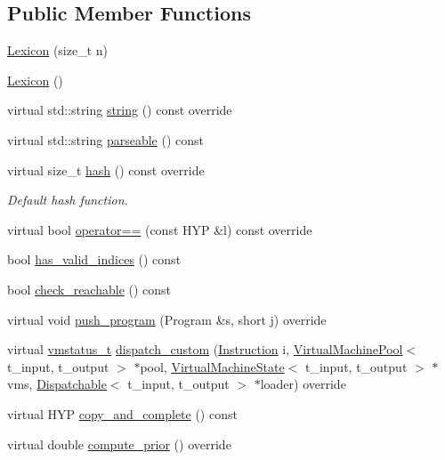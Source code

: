 \subsection*{Public Member Functions}
\begin{DoxyCompactItemize}
\item 
\hyperlink{class_lexicon_a8dde249de3f884484ff14de62a2c6df2}{Lexicon} (size\+\_\+t n)
\item 
\hyperlink{class_lexicon_a1b81e27f60f3e1cb7c0b376ac66aff45}{Lexicon} ()
\item 
virtual std\+::string \hyperlink{class_lexicon_aad37474da522d811415c1ba45ca72dff}{string} () const override
\item 
virtual std\+::string \hyperlink{class_lexicon_a8eda74c4e7500b31a382c182ac60436a}{parseable} () const
\item 
virtual size\+\_\+t \hyperlink{class_lexicon_ab3180c29ad8ec74de2a89ce109226047}{hash} () const override
\begin{DoxyCompactList}\small\item\em Default hash function. \end{DoxyCompactList}\item 
virtual bool \hyperlink{class_lexicon_aff3b862ab4c3db34b3c354c2d205725f}{operator==} (const H\+YP \&l) const override
\item 
bool \hyperlink{class_lexicon_a6d6b1b025ca707815a6776c3898503e4}{has\+\_\+valid\+\_\+indices} () const
\item 
bool \hyperlink{class_lexicon_aeb3e5f9f75e43f2147a22dee67fc8527}{check\+\_\+reachable} () const
\item 
virtual void \hyperlink{class_lexicon_a4473f60c7ebdded00ac5cc9b00a2f4f6}{push\+\_\+program} (Program \&s, short j) override
\item 
virtual \hyperlink{_instruction_8h_a6202215407ab29590bb936ca2996cf64}{vmstatus\+\_\+t} \hyperlink{class_lexicon_a4aad4c15b3193acf498e24a206533e86}{dispatch\+\_\+custom} (\hyperlink{class_instruction}{Instruction} i, \hyperlink{class_virtual_machine_pool}{Virtual\+Machine\+Pool}$<$ t\+\_\+input, t\+\_\+output $>$ $\ast$pool, \hyperlink{class_virtual_machine_state}{Virtual\+Machine\+State}$<$ t\+\_\+input, t\+\_\+output $>$ $\ast$vms, \hyperlink{class_dispatchable}{Dispatchable}$<$ t\+\_\+input, t\+\_\+output $>$ $\ast$loader) override
\item 
virtual H\+YP \hyperlink{class_lexicon_a52a6e819264e04584320adca868aec4a}{copy\+\_\+and\+\_\+complete} () const
\item 
virtual double \hyperlink{class_lexicon_a1edc72e7c3b422d1c13b6cc3eb33d08d}{compute\+\_\+prior} () override

\end{DoxyCompactItemize}
